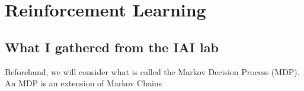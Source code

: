 \documentclass[]{article}
\begin{document}
\section{Reinforcement Learning}
\subsection{What I gathered from the IAI lab}
Beforehand, we will consider what is called the Markov Decision Process (MDP). An MDP is an extension of Markov Chains
\end{document}
